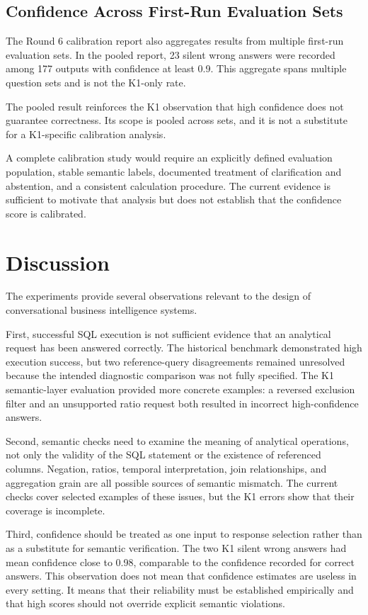 \documentclass[conference]{IEEEtran}
\begin{document}
\subsection{Confidence Across First-Run Evaluation Sets}

The Round 6 calibration report also aggregates results from multiple first-run evaluation sets. In the pooled report, 23 silent wrong answers were recorded among 177 outputs with confidence at least 0.9. This aggregate spans multiple question sets and is not the K1-only rate.

The pooled result reinforces the K1 observation that high confidence does not guarantee correctness. Its scope is pooled across sets, and it is not a substitute for a K1-specific calibration analysis.

A complete calibration study would require an explicitly defined evaluation population, stable semantic labels, documented treatment of clarification and abstention, and a consistent calculation procedure. The current evidence is sufficient to motivate that analysis but does not establish that the confidence score is calibrated.

\section{Discussion}

The experiments provide several observations relevant to the design of conversational business intelligence systems.

First, successful SQL execution is not sufficient evidence that an analytical request has been answered correctly. The historical benchmark demonstrated high execution success, but two reference-query disagreements remained unresolved because the intended diagnostic comparison was not fully specified. The K1 semantic-layer evaluation provided more concrete examples: a reversed exclusion filter and an unsupported ratio request both resulted in incorrect high-confidence answers.

Second, semantic checks need to examine the meaning of analytical operations, not only the validity of the SQL statement or the existence of referenced columns. Negation, ratios, temporal interpretation, join relationships, and aggregation grain are all possible sources of semantic mismatch. The current checks cover selected examples of these issues, but the K1 errors show that their coverage is incomplete.

Third, confidence should be treated as one input to response selection rather than as a substitute for semantic verification. The two K1 silent wrong answers had mean confidence close to 0.98, comparable to the confidence recorded for correct answers. This observation does not mean that confidence estimates are useless in every setting. It means that their reliability must be established empirically and that high scores should not override explicit semantic violations.
\end{document}
